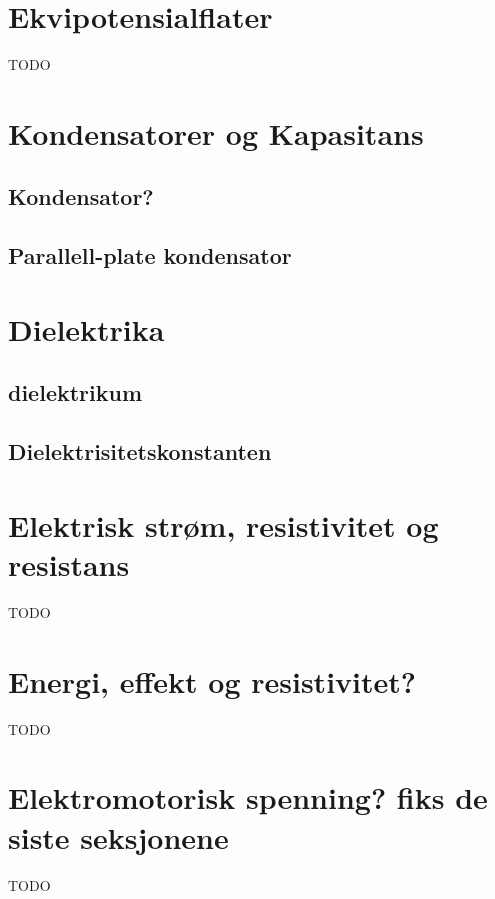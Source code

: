 \documentclass{article}
\begin{document}
  \section{Ekvipotensialflater}
    TODO
  \section{Kondensatorer og Kapasitans}
    \subsection{Kondensator?}
      
    \subsection{Parallell-plate kondensator}
      
  \section{Dielektrika}
    \subsection{dielektrikum}
      
    \subsection{Dielektrisitetskonstanten}
      
  \section{Elektrisk strøm, resistivitet og resistans}
    TODO
  \section{Energi, effekt og resistivitet?}
    TODO
  \section{Elektromotorisk spenning? fiks de siste seksjonene}
    TODO
\end{document}
